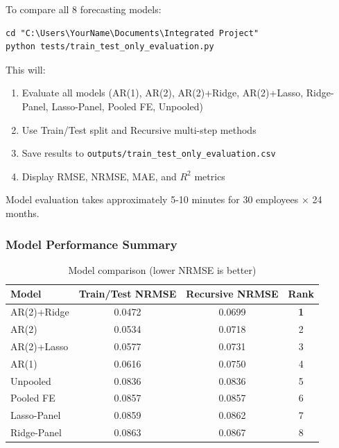 \documentclass[11pt,a4paper]{article}
\begin{document}
To compare all 8 forecasting models:

\begin{commandbox}[title=Run Model Evaluation]
\begin{lstlisting}[style=shellstyle]
cd "C:\Users\YourName\Documents\Integrated Project"
python tests/train_test_only_evaluation.py
\end{lstlisting}
\end{commandbox}

This will:
\begin{enumerate}[leftmargin=*]
    \item Evaluate all models (AR(1), AR(2), AR(2)+Ridge, AR(2)+Lasso, Ridge-Panel, Lasso-Panel, Pooled FE, Unpooled)
    \item Use Train/Test split and Recursive multi-step methods
    \item Save results to \texttt{outputs/train\_test\_only\_evaluation.csv}
    \item Display RMSE, NRMSE, MAE, and $R^2$ metrics
\end{enumerate}

\begin{infobox}[title=Evaluation Time]
Model evaluation takes approximately 5-10 minutes for 30 employees × 24 months.
\end{infobox}

\subsubsection{Model Performance Summary}

\begin{table}[h]
\centering
\small
\begin{tabular}{@{} l c c c @{}}
\toprule
\textbf{Model} & \textbf{Train/Test NRMSE} & \textbf{Recursive NRMSE} & \textbf{Rank} \\
\midrule
AR(2)+Ridge & 0.0472 & 0.0699 & \textbf{1} \\
AR(2) & 0.0534 & 0.0718 & 2 \\
AR(2)+Lasso & 0.0577 & 0.0731 & 3 \\
AR(1) & 0.0616 & 0.0750 & 4 \\
Unpooled & 0.0836 & 0.0836 & 5 \\
Pooled FE & 0.0857 & 0.0857 & 6 \\
Lasso-Panel & 0.0859 & 0.0862 & 7 \\
Ridge-Panel & 0.0863 & 0.0867 & 8 \\
\bottomrule
\end{tabular}
\caption{Model comparison (lower NRMSE is better)}
\end{table}
\end{document}
